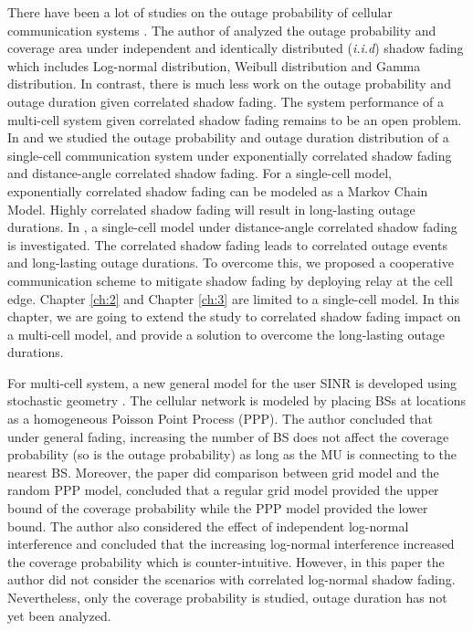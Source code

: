  \par There have been a lot of studies on the outage probability of cellular communication systems \cite{abu1991outage, petrovic2013outage, emamian2014outage}. The author of \cite{vural2015effect} analyzed the outage probability and coverage area under independent and identically distributed (\emph{i.i.d}) shadow fading which includes Log-normal distribution, Weibull distribution and Gamma distribution. In contrast, there is much less work on the outage probability and outage duration given correlated shadow fading. The system performance of a multi-cell system given correlated shadow fading remains to be an open problem. In \cite{lu2015long} and \cite{lu2015shining} we studied the outage probability and outage duration distribution of a single-cell communication system under exponentially correlated shadow fading and distance-angle correlated shadow fading. For a single-cell model, exponentially correlated shadow fading can be modeled as a Markov Chain Model. Highly correlated shadow fading will result in long-lasting outage durations. In \cite{lu2015shining}, a single-cell model under distance-angle correlated shadow fading is investigated. The correlated shadow fading leads to correlated outage events and long-lasting outage durations. To overcome this, we proposed a cooperative communication scheme to mitigate shadow fading by deploying relay at the cell edge. Chapter \ref{ch:2} and Chapter \ref{ch:3} are limited to a single-cell model. In this chapter, we are going to extend the study to correlated shadow fading impact on a multi-cell model, and provide a solution to overcome the long-lasting outage durations.
 \par For multi-cell system, a new general model for the user SINR is developed using stochastic geometry \cite{andrews2011tractable}. The cellular network is modeled by placing BSs at locations as a homogeneous Poisson Point Process (PPP). The author concluded that under general fading, increasing the number of BS does not affect the coverage probability (so is the outage probability) as long as the MU is connecting to the nearest BS. Moreover, the paper did comparison between grid model and the random PPP model, concluded that a regular grid model provided the upper bound of the coverage probability while the PPP model provided the lower bound. The author also considered the effect of independent log-normal interference and concluded that the increasing log-normal interference increased the coverage probability which is counter-intuitive. However, in this paper the author did not consider the scenarios with correlated log-normal shadow fading. Nevertheless, only the coverage probability is studied, outage duration has not yet been analyzed. 
